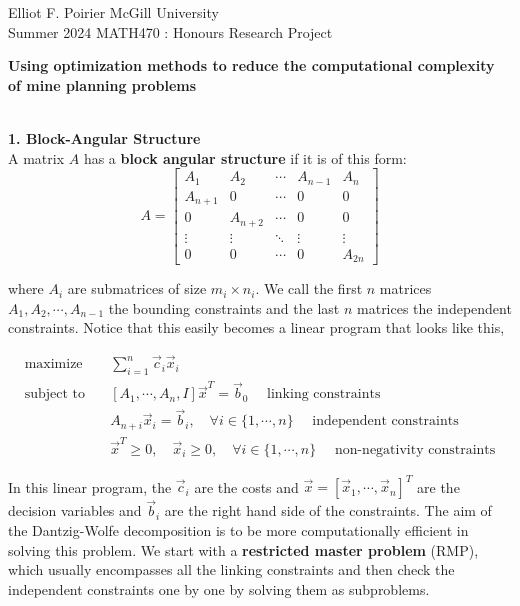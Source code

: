 \documentclass[11pt]{article}
\begin{document}
\noindent Elliot F. Poirier
\hfill
McGill University
\\
Summer 2024
\hfill
MATH470 : Honours Research Project
\\
\begin{center}
\textbf{\LARGE{Using optimization methods to reduce the computational complexity of mine planning problems}}
\end{center}
\hfill
\\


\noindent \textbf{\large{1. Block-Angular Structure}}
\\

\noindent A matrix $A$ has a \textbf{block angular structure} if it is of this form:
\[
A = \begin{bmatrix}
A_{1} & A_{2} & \cdots & A_{n-1} & A_{n} \\
A_{n+1} & 0 & \cdots & 0 & 0 \\
0 & A_{n+2} & \cdots & 0 & 0 \\
\vdots & \vdots & \ddots & \vdots & \vdots \\
0 & 0 & \cdots & 0 & A_{2n}
\end{bmatrix}
\]

\noindent where $A_{i}$ are submatrices of size $m_i \times n_i$. We call the first $n$ matrices $A_1, A_2, \cdots, A_{n-1}$ the bounding constraints and the last $n$ matrices the independent constraints. Notice that this easily becomes a linear program that looks like this, 

$$
\begin{aligned}
\text{maximize} \quad & \sum_{i=1}^{n} \vec{c}_i \vec{x}_i \\
\text{subject to} \quad & [A_1, \cdots, A_n, I] \vec{x}^T = \vec{b}_0 \quad \text{  linking constraints}\\
& A_{n+i} \vec{x}_i = \vec{b}_i, \quad \forall i \in \{1, \cdots, n\} \quad \text{  independent constraints} \\
& \vec{x}^T \geq 0, \quad \vec{x}_i \geq 0, \quad \forall i \in \{1, \cdots, n\} \quad \text{  non-negativity constraints}
\end{aligned}
$$

\noindent In this linear program, the $\vec{c}_i$ are the costs and $\vec{x} = [\vec{x}_1, \cdots, \vec{x}_n]^T$ are the decision variables and $\vec{b}_i$ are the right hand side of the constraints. The aim of the Dantzig-Wolfe decomposition is to be more computationally efficient in solving this problem. We start with a \textbf{restricted master problem} (RMP), which usually encompasses all the linking constraints and then check the independent constraints one by one by solving them as subproblems.
\end{document}
